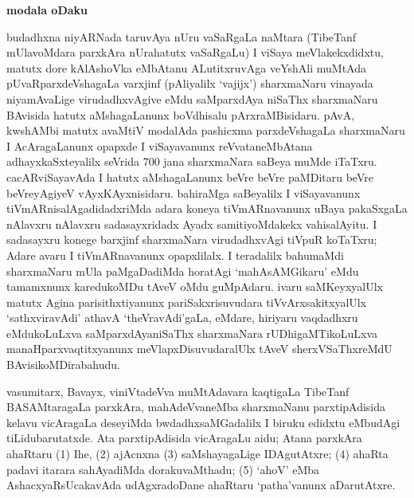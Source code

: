 \begin{center}
{\textbf{\Large modala oDaku}}
\end{center}
budadhxna niyARNada taruvAya nUru vaSaRgaLa naMtara (TibeTanf mUlavoMdara parxkAra nUrahatutx vaSaRgaLu) I viSaya meVlakekxdidxtu, matutx dore kAlAshoVka eMbAtanu ALutitxruvAga veYshAli muMtAda pUvaRparxdeVshagaLa varxjinf (pAliyalilx `vajijx') sharxmaNaru vinayada niyamAvaLige virudadhxvAgive eMdu saMparxdAya niSaThx sharxmaNaru BAvisida hatutx aMshagaLanunx boVdhisalu pArxraMBisidaru. pAvA, kwshAMbi matutx avaMtiV modalAda pashicxma parxdeVshagaLa sharxmaNaru I AcAragaLanunx opapxde I viSayavanunx reVvataneMbAtana adhayxkaSxteyalilx seVrida 700 jana sharxmaNara saBeya muMde iTaTxru. cacARviSayavAda I hatutx
aMshagaLanunx beVre beVre paMDitaru beVre beVreyAgiyeV vAyxKAyxnisidaru. bahiraMga saBeyalilx I viSayavanunx tiVmARnisalAgadidadxriMda adara koneya tiVmARnavanunx uBaya pakaSxgaLa nAlavxru nAlavxru sadasayxridadx Ayadx samitiyoMdakekx vahisalAyitu. I sadasayxru konege barxjinf sharxmaNara virudadhxvAgi tiVpuR koTaTxru; Adare avaru I tiVmARnavanunx opapxlilalx. I teradalilx bahumaMdi sharxmaNaru mUla paMgaDadiMda horatAgi `mahAsAMGikaru' eMdu tamamxnunx karedukoMDu tAveV oMdu guMpAdaru. ivaru saMKeyxyalUlx matutx Agina parisithxtiyanunx pariSakxrisuvudara tiVvArxsakitxyalUlx `sathxviravAdi' athavA `theVravAdi'gaLa, eMdare, hiriyaru vaqdadhxru eMdukoLuLxva saMparxdAyaniSaThx sharxmaNara rUDhigaMTikoLuLxva manaHparxvaqtitxyanunx meVlapxDisuvudaralUlx tAveV sherxVSaThxreMdU BAvisikoMDirabahudu.

vasumitarx, Bavayx, viniVtadeVva muMtAdavara kaqtigaLa TibeTanf BASAMtaragaLa parxkAra, mahAdeVvaneMba sharxmaNanu parxtipAdisida kelavu vicAragaLa deseyiMda bwdadhxsaMGadalilx I biruku edidxtu eMbudAgi tiLidubarutatxde. Ata parxtipAdisida vicAragaLu aidu; Atana parxkAra ahaRtaru (1) Ihe, (2) ajAcnxna (3) saMshayagaLige IDAgutAtxre; (4) ahaRta padavi itarara sahAyadiMda dorakuvaMthadu; (5) `ahoV' eMba AshacxyaRsUcakavAda udAgxradoDane ahaRtaru `patha'vanunx aDarutAtxre.

